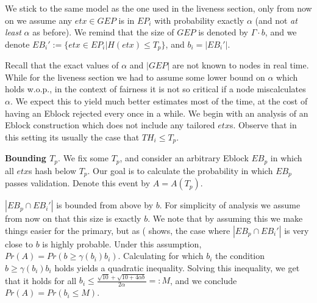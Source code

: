 We stick to the same model as the one used in the liveness section, only from now on we assume any $etx\in GEP$ is in $EP_i$ with probability exactly $\alpha$ (and not \textit{at least} $\alpha$ as before). We remind that the size of $GEP$ is denoted by $\Gamma\cdot b$, and we denote $EB_i':=\{etx\in EP_i\vert H(etx)\leq T_p\}$, and $b_i=|EB_i'|$.

Recall that the exact values of $\alpha$ and $|GEP|$ are not known to nodes in real time. While for the liveness section we had to assume some lower bound on $\alpha$ which holds w.o.p., in the context of fairness it is not so critical if a node miscalculates $\alpha$. We expect this to yield much better estimates most of the time, at the cost of having an Eblock rejected every once in a while. We begin with an analysis of an Eblock construction which does not include any tailored $etx$s. Observe that in this setting its usually the case that $TH_i\leq T_p$. 

\textbf{Bounding $T_p$}.
We fix some $T_p$, and consider an arbitrary Eblock $EB_p$ in which all $etx$s hash below $T_p$. Our goal is to calculate the probability in which $EB_p$ passes validation. Denote this event by $A=A(T_p)$. 


$|EB_p\cap EB_i'|$ is bounded from above by $b$. For simplicity of analysis we assume from now on that this size is exactly $b$. We note that by assuming this we make things easier for the primary, but as ( shows, the case where $|EB_p\cap EB_i'|$ is very close to $b$ is highly probable. Under this assumption, $Pr(A)=Pr\left(b\ge \gamma(b_i)b_i\right)$. Calculating for which $b_i$ the condition $b\ge \gamma(b_i)b_i$ holds yields a quadratic inequality. Solving this inequality, we get that it holds for all $b_i\leq \frac{\sqrt{10}+\sqrt{10+4\alpha b}}{2\alpha}=:M$, and we conclude $Pr(A)=Pr(b_i\leq M)$. 

